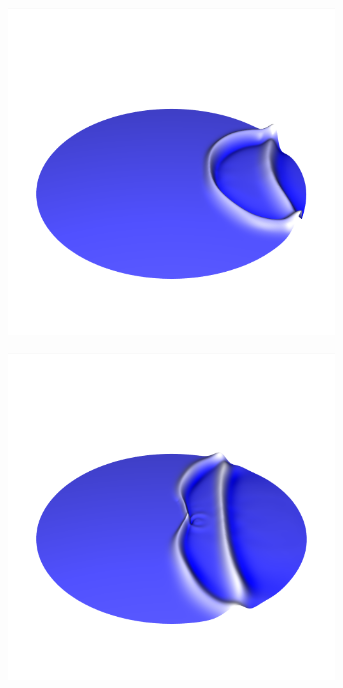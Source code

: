 \documentclass[crop=false,10pt,ngerman]{standalone}
\begin{document}
\begin{figure}[p]
\begin{subfigure}[b]{0.24\textwidth}
          \caption{}
        \end{subfigure}
        \begin{subfigure}[b]{0.24\textwidth}
          \center
          \includegraphics[trim={1.5cm 3.05cm 1.5cm 5.2cm},clip,width=0.95\textwidth]{images/circle_wave_2.png}
          \caption{}
        \end{subfigure}
        \begin{subfigure}[b]{0.24\textwidth}
          \center
          \includegraphics[trim={1.5cm 3.05cm 1.5cm 5.2cm},clip,width=0.95\textwidth]{images/circle_wave_3.png}
          \caption{}
        \end{subfigure}


\end{figure}
\end{document}
